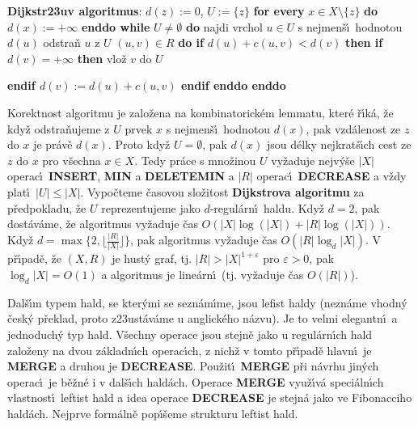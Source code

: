 \documentclass[a4paper,12pt]{article}
\begin{document}
{\bf Dijkstr\accent23uv algoritmus}:\newline 
$d(z):=0$, $U:=\{z\}$\newline 
{\bf for every} $x\in X\setminus \{z\}$ {\bf do} $d(x):=+\infty$ {\bf enddo\newline 
while} $U\ne\emptyset$ {\bf do\newline 
\phantom{{\rm ---}}}najdi vrchol $u\in U$ s nejmen\v s\'\i\ hodnotou $
d(u)$\newline 
\phantom{---}odstra\v n $u$ z $U$\newline 
\phantom{---}{\bf for every} $(u,v)\in R$ {\bf do \newline 
\phantom{{\rm ------}}if} $d(u)+c(u,v)<d(v)$ {\bf then\newline 
\phantom{{\rm ---------}}if} $d(v)=+\infty$ {\bf then} vlo\v z $v$ do $
U$ {\bf endif\newline 
\phantom{{\rm ---------}}$d(v):=d(u)+c(u,v)$\newline 
\phantom{{\rm ------}}endif\newline 
\phantom{{\rm ---}}enddo\newline 
enddo
\bigskip

}\flushpar Korektnost algoritmu je zalo\v zena na kombinatorick\'em 
lemmatu, kter\'e \v r\'\i k\'a, \v ze kdy\v z odstra\-\v nuje\-me z $
U$ prvek $x$ s 
nejmen\v s\'\i\ hodnotou $d(x)$, pak vzd\'alenost ze $z$ do $x$ je pr\'av\v e 
$d(x)$. Proto kdy\v z $U=\emptyset$, pak $d(x)$ jsou d\'elky nejkrat\v s\'\i ch cest ze 
$z$ do $x$ pro v\v sechna $x\in X$. Tedy pr\'ace s mno\v zinou $U$ vy\v zaduje 
nejv\'y\v se $|X|$ operac\'\i\ {\bf INSERT}, {\bf MIN} a {\bf DELETEMIN} a $
|R|$ operac\'\i\ 
{\bf DECREASE} a v\v zdy plat\'\i\ $|U|\le |X|$. Vypo\v cteme \v casovou slo\v zitost 
{\bf Dijkstrova algoritmu} za p\v redpokladu, \v ze $U$ reprezentujeme jako $
d$-regul\'arn\'\i\ 
haldu. Kdy\v z $d=2$, pak dost\'av\'ame, \v ze algoritmus vy\v zaduje \v cas 
$O(|X|\log(|X|)+|R|\log(|X|))$. Kdy\v z $d=\max\{2,\lfloor\frac {
|R|}{|X|}\rfloor \}$, pak algoritmus 
vy\v zaduje \v cas $O(|R|\log_d|X|)$. V p\v r\'\i pad\v e, \v ze $
(X,R)$ je hust\'y graf, 
tj. $|R|>|X|^{1+\varepsilon}$ pro $\varepsilon >0$, pak $\log_d|X
|=O(1)$ a algoritmus 
je line\'arn\'\i\ (tj. vy\v zaduje \v cas $O(|R|)$).
\bigskip
 
\centerline{}
\medskip

\flushpar Dal\v s\'\i m typem hald, se kter\'ymi se sezn\'am\'\i me, jsou lefist 
haldy (nezn\'ame vhodn\'y \v cesk\'y p\v reklad, proto z\accent23ust\'av\'ame 
u anglick\'eho n\'azvu). Je to velmi elegantn\'\i\ a jednoduch\'y typ 
hald. V\v sechny operace jsou stejn\v e jako u regul\'arn\'\i ch hald 
zalo\v zeny na 
dvou z\'akladn\'\i ch operac\'\i ch, z nich\v z v tomto p\v r\'\i pad\v e hlavn\'\i\ je {\bf MERGE} a  
druhou je {\bf DECREASE}. Pou\v zit\'\i\ {\bf MERGE }
p\v ri n\'avrhu jin\'ych operac\'\i\ je b\v e\v zn\'e i v dal\v s\'\i ch hald\'ach. 
Operace {\bf MERGE} vyu\v z\'\i v\'a speci\'aln\'\i ch vlastnost\'\i\ leftist 
hald a idea operace {\bf DECREASE} je stejn\'a jako ve 
Fibonacciho hald\'ach. Nejprve form\'aln\v e pop\'\i\v seme strukturu 
leftist hald. 
\medskip
\end{document}
